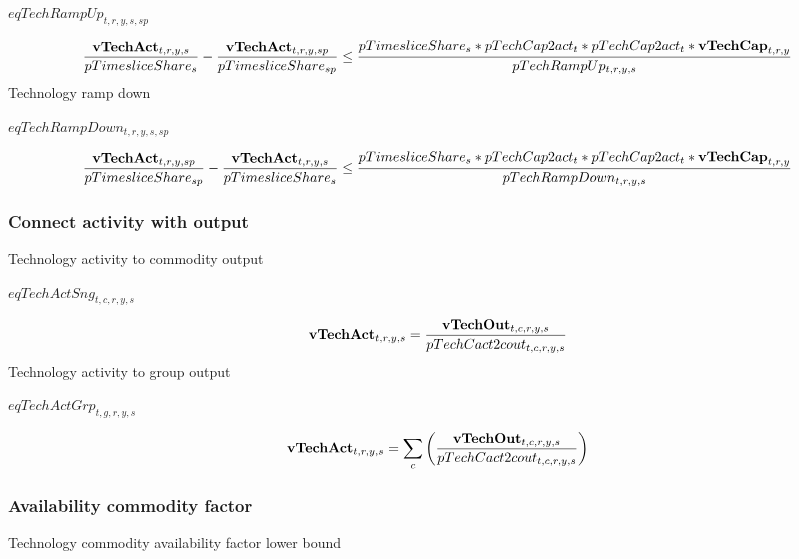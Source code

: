 \documentclass{article}
\begin{document}
$eqTechRampUp_{t,r,y,s,sp}$





\begin{dmath}
\frac{{\bf vTechAct}_{t,r,y,s}}{pTimesliceShare_{s}}-\frac{{\bf vTechAct}_{t,r,y,sp}}{pTimesliceShare_{sp}}  \le  \frac{pTimesliceShare_{s}*pTechCap2act_{t}*pTechCap2act_{t}*{\bf vTechCap}_{t,r,y}}{pTechRampUp_{t,r,y,s}}
\end{dmath}
Technology ramp down







$eqTechRampDown_{t,r,y,s,sp}$





\begin{dmath}
\frac{{\bf vTechAct}_{t,r,y,sp}}{pTimesliceShare_{sp}}-\frac{{\bf vTechAct}_{t,r,y,s}}{pTimesliceShare_{s}}  \le  \frac{pTimesliceShare_{s}*pTechCap2act_{t}*pTechCap2act_{t}*{\bf vTechCap}_{t,r,y}}{pTechRampDown_{t,r,y,s}}
\end{dmath}
\subsubsection*{Connect activity with output}
Technology activity to commodity output







$eqTechActSng_{t,c,r,y,s}$





\begin{dmath}
{\bf vTechAct}_{t,r,y,s}  =  \frac{{\bf vTechOut}_{t,c,r,y,s}}{pTechCact2cout_{t,c,r,y,s}}
\end{dmath}
Technology activity to group output







$eqTechActGrp_{t,g,r,y,s}$





\begin{dmath}
{\bf vTechAct}_{t,r,y,s}  =  \sum_{c}{\left(\frac{{\bf vTechOut}_{t,c,r,y,s}}{pTechCact2cout_{t,c,r,y,s}}\right)}
\end{dmath}
\subsubsection*{Availability commodity factor}
Technology commodity availability factor lower bound
\end{document}
